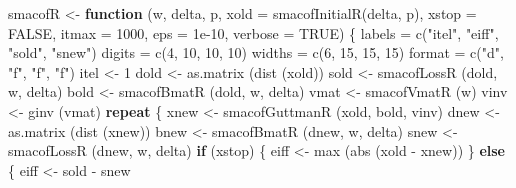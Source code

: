 \documentclass[
  12pt,
]{book}
\newenvironment{Shaded}{\begin{snugshade}}{\end{snugshade}}
\newcommand{\AttributeTok}[1]{\textcolor[rgb]{0.77,0.63,0.00}{#1}}
\newcommand{\ConstantTok}[1]{\textcolor[rgb]{0.00,0.00,0.00}{#1}}
\newcommand{\ControlFlowTok}[1]{\textcolor[rgb]{0.13,0.29,0.53}{\textbf{#1}}}
\newcommand{\DecValTok}[1]{\textcolor[rgb]{0.00,0.00,0.81}{#1}}
\newcommand{\FloatTok}[1]{\textcolor[rgb]{0.00,0.00,0.81}{#1}}
\newcommand{\FunctionTok}[1]{\textcolor[rgb]{0.00,0.00,0.00}{#1}}
\newcommand{\NormalTok}[1]{#1}
\newcommand{\OtherTok}[1]{\textcolor[rgb]{0.56,0.35,0.01}{#1}}
\newcommand{\SpecialCharTok}[1]{\textcolor[rgb]{0.00,0.00,0.00}{#1}}
\newcommand{\StringTok}[1]{\textcolor[rgb]{0.31,0.60,0.02}{#1}}
\theoremstyle{definition}
\theoremstyle{definition}
\theoremstyle{definition}
\theoremstyle{definition}
\theoremstyle{remark}
\begin{document}
\begin{Shaded}
\begin{Highlighting}[]
\NormalTok{smacofR }\OtherTok{\textless{}{-}}
  \ControlFlowTok{function}\NormalTok{ (w,}
\NormalTok{            delta,}
\NormalTok{            p,}
            \AttributeTok{xold =} \FunctionTok{smacofInitialR}\NormalTok{(delta, p),}
            \AttributeTok{xstop =} \ConstantTok{FALSE}\NormalTok{,}
            \AttributeTok{itmax =} \DecValTok{1000}\NormalTok{,}
            \AttributeTok{eps =} \FloatTok{1e{-}10}\NormalTok{,}
            \AttributeTok{verbose =} \ConstantTok{TRUE}\NormalTok{) \{}
\NormalTok{    labels }\OtherTok{=} \FunctionTok{c}\NormalTok{(}\StringTok{"itel"}\NormalTok{, }\StringTok{"eiff"}\NormalTok{, }\StringTok{"sold"}\NormalTok{, }\StringTok{"snew"}\NormalTok{)}
\NormalTok{    digits }\OtherTok{=} \FunctionTok{c}\NormalTok{(}\DecValTok{4}\NormalTok{, }\DecValTok{10}\NormalTok{, }\DecValTok{10}\NormalTok{, }\DecValTok{10}\NormalTok{)}
\NormalTok{    widths }\OtherTok{=} \FunctionTok{c}\NormalTok{(}\DecValTok{6}\NormalTok{, }\DecValTok{15}\NormalTok{, }\DecValTok{15}\NormalTok{, }\DecValTok{15}\NormalTok{)}
\NormalTok{    format }\OtherTok{=} \FunctionTok{c}\NormalTok{(}\StringTok{"d"}\NormalTok{, }\StringTok{"f"}\NormalTok{, }\StringTok{"f"}\NormalTok{, }\StringTok{"f"}\NormalTok{)}
\NormalTok{    itel }\OtherTok{\textless{}{-}} \DecValTok{1}
\NormalTok{    dold }\OtherTok{\textless{}{-}} \FunctionTok{as.matrix}\NormalTok{ (}\FunctionTok{dist}\NormalTok{ (xold))}
\NormalTok{    sold }\OtherTok{\textless{}{-}} \FunctionTok{smacofLossR}\NormalTok{ (dold, w, delta)}
\NormalTok{    bold }\OtherTok{\textless{}{-}} \FunctionTok{smacofBmatR}\NormalTok{ (dold, w, delta)}
\NormalTok{    vmat }\OtherTok{\textless{}{-}} \FunctionTok{smacofVmatR}\NormalTok{ (w)}
\NormalTok{    vinv }\OtherTok{\textless{}{-}} \FunctionTok{ginv}\NormalTok{ (vmat)}
    \ControlFlowTok{repeat}\NormalTok{ \{}
\NormalTok{      xnew }\OtherTok{\textless{}{-}} \FunctionTok{smacofGuttmanR}\NormalTok{ (xold, bold, vinv)}
\NormalTok{      dnew }\OtherTok{\textless{}{-}} \FunctionTok{as.matrix}\NormalTok{ (}\FunctionTok{dist}\NormalTok{ (xnew))}
\NormalTok{      bnew }\OtherTok{\textless{}{-}} \FunctionTok{smacofBmatR}\NormalTok{ (dnew, w, delta)}
\NormalTok{      snew }\OtherTok{\textless{}{-}} \FunctionTok{smacofLossR}\NormalTok{ (dnew, w, delta)}
      \ControlFlowTok{if}\NormalTok{ (xstop) \{}
\NormalTok{        eiff }\OtherTok{\textless{}{-}} \FunctionTok{max}\NormalTok{ (}\FunctionTok{abs}\NormalTok{ (xold }\SpecialCharTok{{-}}\NormalTok{ xnew))}
\NormalTok{      \} }\ControlFlowTok{else}\NormalTok{ \{}
\NormalTok{        eiff }\OtherTok{\textless{}{-}}\NormalTok{ sold }\SpecialCharTok{{-}}\NormalTok{ snew}

\end{Highlighting}
\end{Shaded}
\end{document}
